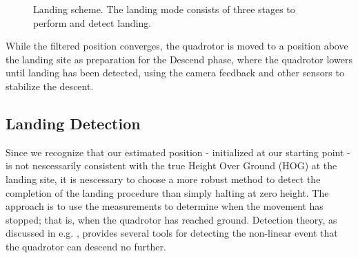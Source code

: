         \begin{figure}[H]
            \noindent{}
            \caption{Landing scheme. The landing mode consists of three stages to perform and detect landing.}
            \label{fig:logic:landingscheme}
        \end{figure}

        While the filtered position converges, the quadrotor is moved to
        a position above the landing site as preparation for the Descend phase,
        where the quadrotor lowers until landing has been detected,
        using the camera feedback and other sensors to stabilize the descent.

        \subsection{Landing Detection}
        \label{ssec:logic:landing:detection}
            Since we recognize that our estimated position - initialized at our starting point -
            is not nescessarily consistent with the true Height Over Ground (HOG)
            at the landing site, it is nescessary to choose a more robust
            method to detect the completion of the landing procedure than simply halting at zero height.
            The approach is to use the measurements to determine when the movement
            has stopped; that is, when the quadrotor has reached ground.
            Detection theory, as discussed in e.g. \citep{Tornqvist08,nyberg11diagnosis},
            provides several tools for detecting the non-linear event that
            the quadrotor can descend no further.

